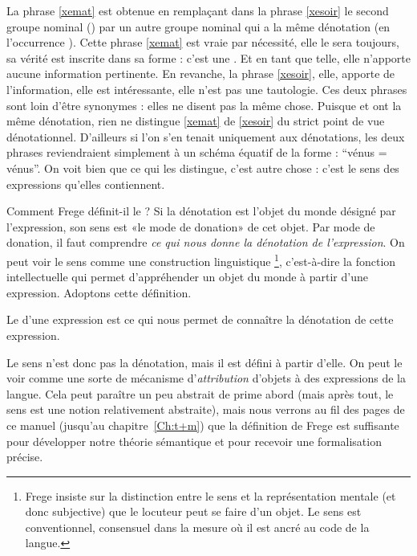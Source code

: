 La phrase \ref{xemat} est obtenue en remplaçant dans la phrase
\ref{xesoir} le second groupe nominal () par
un autre groupe nominal qui a la même dénotation (en l'occurrence
).  Cette phrase \ref{xemat} est vraie par
nécessité, elle le sera toujours, sa vérité est inscrite dans sa
forme : c'est  une .  Et en
tant que telle, elle n'apporte aucune information pertinente.  En
revanche, la phrase \ref{xesoir}, elle, apporte de l'information,
elle est intéressante, elle n'est pas une tautologie.  Ces deux
phrases sont loin d'être synonymes : elles ne disent pas la même
chose.  Puisque  et  ont la même dénotation, rien ne distingue \ref{xemat} de
\ref{xesoir} du strict point de vue dénotationnel.  D'ailleurs si l'on
s'en tenait uniquement aux dénotations, les deux phrases reviendraient
simplement à un schéma équatif de la forme : ``vénus = vénus''.  On
voit bien que ce qui les distingue, c'est autre chose : c'est le sens
des expressions qu'elles contiennent.

\largerpage[-1]

Comment Frege définit-il le  ? Si la dénotation est l'objet du
monde désigné 
par l'expression, son sens est «le mode de donation» de
cet objet.  Par mode de donation, il faut comprendre \emph{ce qui nous
  donne la dénotation de l'expression}.  
On peut  voir le sens comme une construction linguistique%
\footnote{Frege
insiste sur la distinction entre le sens et la représentation mentale
(et donc subjective) que le locuteur peut se faire d'un 
objet. Le sens est conventionnel, consensuel dans la mesure où il est
ancré au code de la langue.}, %
 c'est-à-dire la fonction 
intellectuelle qui permet
d'appréhender un objet du monde à partir d'une expression.
Adoptons cette définition.



\begin{defi}[Sens]
\label{def:sens}
Le  d'une expression est ce qui nous permet de connaître la
dénotation de cette expression.  
\end{defi}

Le sens n'est donc pas la dénotation, mais il est défini à partir d'elle.
On peut le voir comme une sorte de
mécanisme d'\emph{attribution} d'objets à des expressions de la  langue.  
Cela peut paraître un peu abstrait de prime abord (mais après tout, le
sens est une notion relativement abstraite), mais nous verrons au fil
des pages de ce manuel (jusqu'au chapitre~\ref{Ch:t+m}) que la
définition de Frege est suffisante pour développer notre théorie
sémantique et pour recevoir une formalisation précise.

